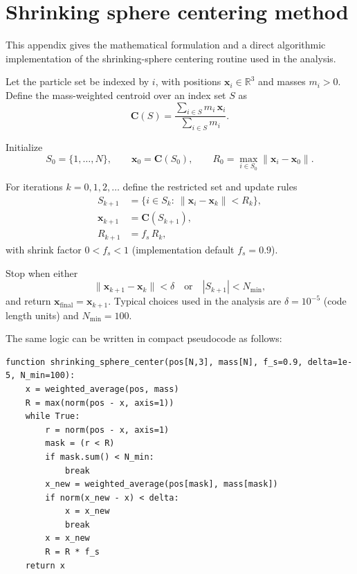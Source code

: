 \appendix
\chapter{Shrinking sphere centering method}
\label{app:shrinking_sphere}

This appendix gives the mathematical formulation and a direct algorithmic implementation of the shrinking-sphere centering routine used in the analysis.

Let the particle set be indexed by $i$, with positions $\mathbf{x}_i\in\mathbb{R}^3$ and masses $m_i>0$. Define the mass-weighted centroid over an index set $S$ as
\begin{equation}
\mathbf{C}(S) = \frac{\sum_{i\in S} m_i\,\mathbf{x}_i}{\sum_{i\in S} m_i}.
\end{equation}

Initialize
\begin{equation}
S_0 = \{1,\dots,N\},\qquad \mathbf{x}_0 = \mathbf{C}(S_0),\qquad R_0 = \max_{i\in S_0}\|\mathbf{x}_i-\mathbf{x}_0\|.
\end{equation}

For iterations $k=0,1,2,\dots$ define the restricted set and update rules
\begin{align}
S_{k+1} &= \{i\in S_k:\ \|\mathbf{x}_i-\mathbf{x}_k\| < R_k\}, \\
\mathbf{x}_{k+1} &= \mathbf{C}(S_{k+1}), \\
R_{k+1} &= f_s\,R_k,
\end{align}
with shrink factor $0<f_s<1$ (implementation default $f_s=0.9$).

Stop when either
\begin{equation}
\|\mathbf{x}_{k+1}-\mathbf{x}_k\| < \delta \quad\text{or}\quad |S_{k+1}| < N_{\min},
\end{equation}
and return $\mathbf{x}_{\mathrm{final}}=\mathbf{x}_{k+1}$. Typical choices used in the analysis are $\delta=10^{-5}$ (code length units) and $N_{\min}=100$.

The same logic can be written in compact pseudocode as follows:
\begin{lstlisting}[basicstyle=\footnotesize\ttfamily,breaklines=true]
function shrinking_sphere_center(pos[N,3], mass[N], f_s=0.9, delta=1e-5, N_min=100):
	x = weighted_average(pos, mass)
	R = max(norm(pos - x, axis=1))
	while True:
		r = norm(pos - x, axis=1)
		mask = (r < R)
		if mask.sum() < N_min:
			break
		x_new = weighted_average(pos[mask], mass[mask])
		if norm(x_new - x) < delta:
			x = x_new
			break
		x = x_new
		R = R * f_s
	return x
\end{lstlisting}


